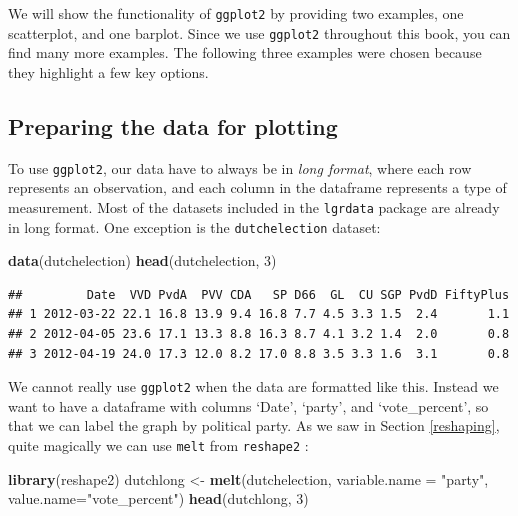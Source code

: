\documentclass[]{book}
\newenvironment{Shaded}{\begin{snugshade}}{\end{snugshade}}
\newcommand{\DataTypeTok}[1]{\textcolor[rgb]{0.13,0.29,0.53}{#1}}
\newcommand{\DecValTok}[1]{\textcolor[rgb]{0.00,0.00,0.81}{#1}}
\newcommand{\KeywordTok}[1]{\textcolor[rgb]{0.13,0.29,0.53}{\textbf{#1}}}
\newcommand{\NormalTok}[1]{#1}
\newcommand{\StringTok}[1]{\textcolor[rgb]{0.31,0.60,0.02}{#1}}
\begin{document}
We will show the functionality of \texttt{ggplot2} by providing two examples, one scatterplot, and one barplot. Since we use \texttt{ggplot2} throughout this book, you can find many more examples. The following three examples were chosen because they highlight a few key options.

\hypertarget{preparing-the-data-for-plotting}{%
\subsection{Preparing the data for plotting}\label{preparing-the-data-for-plotting}}

To use \texttt{ggplot2}, our data have to always be in \emph{long format}, where each row represents an observation, and each column in the dataframe represents a type of measurement. Most of the datasets included in the \texttt{lgrdata} package are already in long format. One exception is the \texttt{dutchelection} dataset:

\begin{Shaded}
\begin{Highlighting}[]
\KeywordTok{data}\NormalTok{(dutchelection)}
\KeywordTok{head}\NormalTok{(dutchelection, }\DecValTok{3}\NormalTok{)}
\end{Highlighting}
\end{Shaded}

\begin{verbatim}
##         Date  VVD PvdA  PVV CDA   SP D66  GL  CU SGP PvdD FiftyPlus
## 1 2012-03-22 22.1 16.8 13.9 9.4 16.8 7.7 4.5 3.3 1.5  2.4       1.1
## 2 2012-04-05 23.6 17.1 13.3 8.8 16.3 8.7 4.1 3.2 1.4  2.0       0.8
## 3 2012-04-19 24.0 17.3 12.0 8.2 17.0 8.8 3.5 3.3 1.6  3.1       0.8
\end{verbatim}

We cannot really use \texttt{ggplot2} when the data are formatted like this. Instead we want to have a dataframe with columns `Date', `party', and `vote\_percent', so that we can label the graph by political party. As we saw in Section \ref{reshaping}, quite magically we can use \texttt{melt} from \texttt{reshape2} :

\begin{Shaded}
\begin{Highlighting}[]
\KeywordTok{library}\NormalTok{(reshape2)}
\NormalTok{dutchlong <-}\StringTok{ }\KeywordTok{melt}\NormalTok{(dutchelection, }\DataTypeTok{variable.name =} \StringTok{"party"}\NormalTok{, }\DataTypeTok{value.name=}\StringTok{"vote_percent"}\NormalTok{)}
\KeywordTok{head}\NormalTok{(dutchlong, }\DecValTok{3}\NormalTok{)}
\end{Highlighting}
\end{Shaded}
\end{document}
